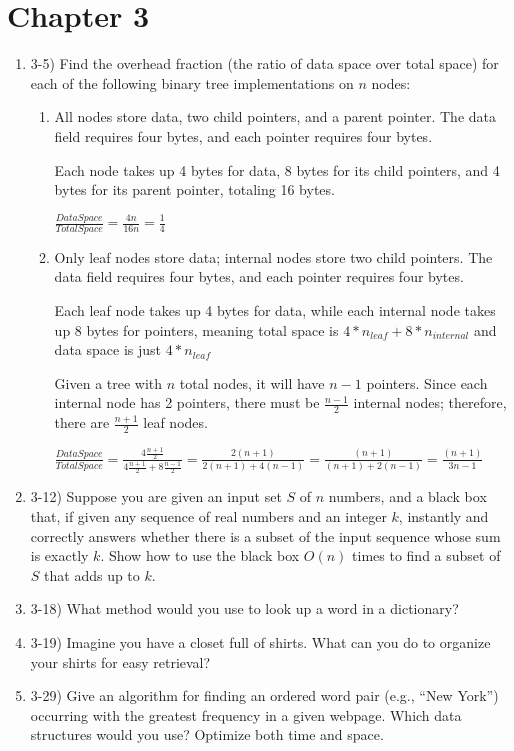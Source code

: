 \documentclass{article}
\begin{document}
\section{Chapter 3}
\begin{enumerate}
    \item 3-5) Find the overhead fraction (the ratio of data space over total space) for each of the following binary tree implementations on $n$ nodes:
    \begin{enumerate}
        \item All nodes store data, two child pointers, and a parent pointer. The data field requires four bytes, and each pointer requires four bytes. 
        
        Each node takes up 4 bytes for data, 8 bytes for its child pointers, and 4 bytes for its parent pointer, totaling 16 bytes.
        
        $\frac{DataSpace}{TotalSpace}=\frac{4n}{16n}=\boxed{\frac{1}{4}}$
        
        \item Only leaf nodes store data; internal nodes store two child pointers. The data field requires four bytes, and each pointer requires four bytes.

        Each leaf node takes up 4 bytes for data, while each internal node takes up 8 bytes for pointers, meaning total space is $4*n_{leaf} + 8*n_{internal}$ and data space is just $4*n_{leaf}$ 

        Given a tree with $n$ total nodes, it will have $n-1$ pointers. Since each internal node has 2 pointers, there must be $\frac{n-1}{2}$ internal nodes; therefore, there are $\frac{n+1}{2}$ leaf nodes.

        $\frac{DataSpace}{TotalSpace}=\frac{4\frac{n+1}{2}}{4\frac{n+1}{2}+8\frac{n-1}{2}}=\frac{2(n+1)}{2(n+1)+4(n-1)}=\frac{(n+1)}{(n+1)+2(n-1)}=\boxed{\frac{(n+1)}{3n-1}}$
        
    \end{enumerate}
    \item 3-12) Suppose you are given an input set $S$ of $n$ numbers, and a black box that, if given any sequence of real numbers and an integer $k$, instantly and correctly answers whether there is a subset of the input sequence whose sum is exactly $k$. Show how to use the black box $O(n)$ times to find a subset of $S$ that adds up to $k$.
    \item 3-18) What method would you use to look up a word in a dictionary?
    \item 3-19) Imagine you have a closet full of shirts. What can you do to organize your shirts for easy retrieval?
    \item 3-29) Give an algorithm for finding an ordered word pair (e.g., “New York”) occurring with the greatest frequency in a given webpage. Which data structures would you use? Optimize both time and space. 
\end{enumerate}
\end{document}
